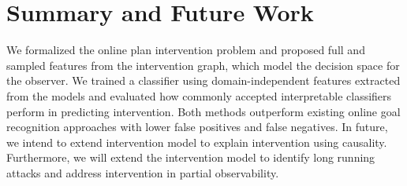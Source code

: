 \documentclass[letterpaper]{article}
\theoremstyle{plain}
\begin{document}
\section{Summary and Future Work}
We formalized the online plan intervention problem and proposed full and sampled features from the intervention graph, which model the decision space for the observer. We trained a classifier using domain-independent features extracted from the models and evaluated how commonly accepted interpretable classifiers perform in predicting intervention. Both methods outperform existing online goal recognition approaches with lower false positives and false negatives. In future, we intend to extend intervention model to explain intervention using causality. Furthermore, we will extend the intervention model to identify long running attacks and address intervention in partial observability. %
\clearpage %
\begin{small}


\end{small}
\end{document}
